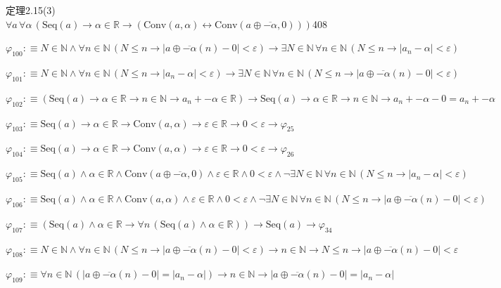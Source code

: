 \begin{fullproof}{定理2.15(3)}{$\forall a\,\forall \alpha\,(\mathrm{Seq}(a) \to \alpha \in \mathbb{R} \to (\mathrm{Conv}(a,\alpha) \leftrightarrow \mathrm{Conv}(a \oplus \overline{-\alpha},0)))$}{408}
\begin{abbrevlist}
\item $\varphi_{100} :\equiv N \in \mathbb{N} \land \forall n \in \mathbb{N}\,(N \leq n \to \lvert a \oplus \overline{-\alpha}(n) - 0 \rvert < \varepsilon) \to \exists N \in \mathbb{N}\,\forall n \in \mathbb{N}\,(N \leq n \to \lvert a_{n} - \alpha \rvert < \varepsilon)$
\item $\varphi_{101} :\equiv N \in \mathbb{N} \land \forall n \in \mathbb{N}\,(N \leq n \to \lvert a_{n} - \alpha \rvert < \varepsilon) \to \exists N \in \mathbb{N}\,\forall n \in \mathbb{N}\,(N \leq n \to \lvert a \oplus \overline{-\alpha}(n) - 0 \rvert < \varepsilon)$
\item $\varphi_{102} :\equiv (\mathrm{Seq}(a) \to \alpha \in \mathbb{R} \to n \in \mathbb{N} \to a_{n} + -\alpha \in \mathbb{R}) \to \mathrm{Seq}(a) \to \alpha \in \mathbb{R} \to n \in \mathbb{N} \to a_{n} + -\alpha - 0 = a_{n} + -\alpha$
\item $\varphi_{103} :\equiv \mathrm{Seq}(a) \to \alpha \in \mathbb{R} \to \mathrm{Conv}(a,\alpha) \to \varepsilon \in \mathbb{R} \to 0 < \varepsilon \to \varphi_{25}$
\item $\varphi_{104} :\equiv \mathrm{Seq}(a) \to \alpha \in \mathbb{R} \to \mathrm{Conv}(a,\alpha) \to \varepsilon \in \mathbb{R} \to 0 < \varepsilon \to \varphi_{26}$
\item $\varphi_{105} :\equiv \mathrm{Seq}(a) \land \alpha \in \mathbb{R} \land \mathrm{Conv}(a \oplus \overline{-\alpha},0) \land \varepsilon \in \mathbb{R} \land 0 < \varepsilon \land \neg \exists N \in \mathbb{N}\,\forall n \in \mathbb{N}\,(N \leq n \to \lvert a_{n} - \alpha \rvert < \varepsilon)$
\item $\varphi_{106} :\equiv \mathrm{Seq}(a) \land \alpha \in \mathbb{R} \land \mathrm{Conv}(a,\alpha) \land \varepsilon \in \mathbb{R} \land 0 < \varepsilon \land \neg \exists N \in \mathbb{N}\,\forall n \in \mathbb{N}\,(N \leq n \to \lvert a \oplus \overline{-\alpha}(n) - 0 \rvert < \varepsilon)$
\item $\varphi_{107} :\equiv (\mathrm{Seq}(a) \land \alpha \in \mathbb{R} \to \forall n\,(\mathrm{Seq}(a) \land \alpha \in \mathbb{R})) \to \mathrm{Seq}(a) \to \varphi_{34}$
\item $\varphi_{108} :\equiv N \in \mathbb{N} \land \forall n \in \mathbb{N}\,(N \leq n \to \lvert a \oplus \overline{-\alpha}(n) - 0 \rvert < \varepsilon) \to n \in \mathbb{N} \to N \leq n \to \lvert a \oplus \overline{-\alpha}(n) - 0 \rvert < \varepsilon$
\item $\varphi_{109} :\equiv \forall n \in \mathbb{N}\,(\lvert a \oplus \overline{-\alpha}(n) - 0 \rvert = \lvert a_{n} - \alpha \rvert) \to n \in \mathbb{N} \to \lvert a \oplus \overline{-\alpha}(n) - 0 \rvert = \lvert a_{n} - \alpha \rvert$

\end{abbrevlist}
\end{fullproof}
